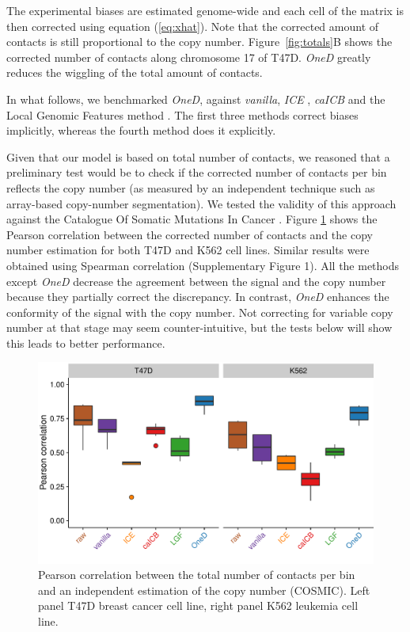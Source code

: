 \documentclass{bioinfo}
\begin{document}
The experimental biases are estimated genome-wide and each cell of the
matrix is then corrected using equation (\ref{eq:xhat}). Note that the
corrected amount of contacts is still proportional to the copy number.
Figure~\ref{fig:totals}B shows the corrected number of contacts along
chromosome 17 of T47D. \textit{OneD} greatly reduces the wiggling of the
total amount of contacts.


In what follows, we benchmarked \textit{OneD}, against \textit{vanilla},
\textit{ICE} \citep{imakaev2012iterative}, \textit{caICB}
\citep{wu2016computational} and the Local Genomic Features method
\citep[\textit{LGF},][]{hu2012hicnorm, servant2012hitc}. The first three
methods correct biases implicitly, whereas the fourth method does it
explicitly.

Given that our model is based on total number of contacts, we reasoned
that a preliminary test would be to check if the corrected number of
contacts per bin reflects the copy number (as measured by an independent
technique such as array-based copy-number segmentation). We tested the
validity of this approach against the Catalogue Of Somatic Mutations In
Cancer \citep[COSMIC,][]{forbes2010cosmic}. Figure \ref{fig:copy_number}
shows the Pearson correlation between the corrected number of contacts and
the copy number estimation for both T47D and K562 cell lines. Similar
results were obtained using Spearman correlation (Supplementary Figure 1).
All the methods except \textit{OneD} decrease the agreement between the
signal and the copy number because they partially correct the discrepancy.
In contrast, \textit{OneD} enhances the conformity of the signal with the
copy number.  Not correcting for variable copy number at that stage may
seem counter-intuitive, but the tests below will show this leads to better
performance.


\begin{figure}[b]
	\centerline{\includegraphics[width=.45\textwidth]
{img/copy_number_figure2.pdf}}
\caption{Pearson correlation between the total number of contacts per bin
and an independent estimation of the copy number (COSMIC). Left panel
T47D breast cancer cell line, right panel K562 leukemia cell line.}
\label{fig:copy_number}
\end{figure}
\end{document}
